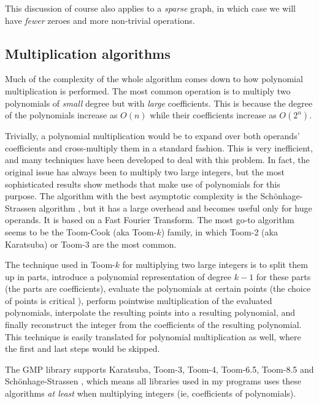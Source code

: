 \documentclass[a4paper]{article}
\begin{document}
This discussion of course also applies to a \emph{sparse} graph, in which case we will have \emph{fewer} zeroes and more non-trivial operations.

\subsection{Multiplication algorithms}
Much of the complexity of the whole algorithm comes down to how polynomial multiplication is performed. The most common operation is to multiply two polynomials of \emph{small} degree but with \emph{large} coefficients. This is because the degree of the polynomials increase as $O(n)$ while their coefficients increase as $O(2^n)$. %

Trivially, a polynomial multiplication would be to expand over both operands' coefficients and cross-multiply them in a standard fashion. This is very inefficient, and many techniques have been developed to deal with this problem. In fact, the original issue has always been to multiply two large integers, but the most sophisticated results show methods that make use of polynomials for this purpose. The algorithm with the best asymptotic complexity is the Schönhage-Strassen algorithm \cite{strass}, but it has a large overhead and becomes useful only for huge operands. It is based on a Fast Fourier Transform. The most go-to algorithm seems to be the Toom-Cook \cite{toom-cook} (aka Toom-$k$) family, in which Toom-2 (aka Karatsuba) or Toom-3 are the most common.

The technique used in Toom-$k$ for multiplying two large integers is to split them up in parts, introduce a polynomial representation of degree $k-1$ for these parts (the parts are coefficients), evaluate the polynomials at certain points (the choice of points is critical%
), perform pointwise multiplication of the evaluated polynomials, interpolate the resulting points into a resulting polynomial, and finally reconstruct the integer from the coefficients of the resulting polynomial. This technique is easily translated for polynomial multiplication as well, where the first and last steps would be skipped.

The GMP library supports Karatsuba, Toom-3, Toom-4, Toom-6.5, Toom-8.5 and Schönhage-Strassen \cite[p 90]{gmp}, which means all libraries used in my programs uses these algorithms \emph{at least} when multiplying integers (ie, coefficients of polynomials).
\end{document}

